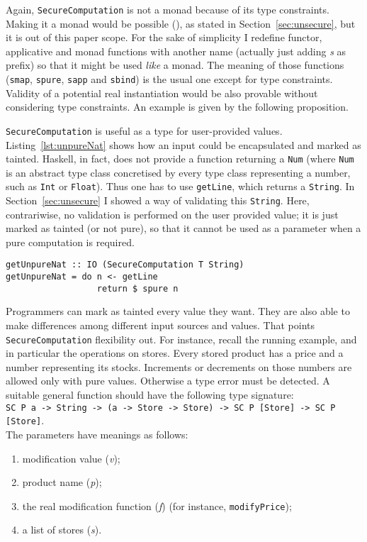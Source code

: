 Again, \texttt{SecureComputation} is not a monad because of its type constraints. Making it a monad would be possible (\cite{Sculthorpe:13:ConstrainedMonad}), as stated in Section~\ref{sec:unsecure}, but it is out of this paper scope. For the sake of simplicity I redefine functor, applicative and monad functions with another name (actually just adding \textit{s} as prefix) so that it might be used \textit{like} a monad. The meaning of those functions (\texttt{smap}, \texttt{spure}, \texttt{sapp} and \texttt{sbind}) is the usual one except for type constraints. Validity of a potential real instantiation would be also provable without considering type constraints. An example is given by the following proposition.

\texttt{SecureComputation} is useful as a type for user-provided values. Listing~\ref{lst:unpureNat} shows how an input could be encapsulated and marked as tainted. Haskell, in fact, does not provide a function returning a \texttt{Num} (where \texttt{Num} is an abstract type class concretised by every type class representing a number, such as \texttt{Int} or \texttt{Float}). Thus one has to use \texttt{getLine}, which returns a \texttt{String}. In Section~\ref{sec:unsecure} I showed a way of validating this \texttt{String}. Here, contrariwise, no validation is performed on the user provided value; it is just marked as tainted (or not pure), so that it cannot be used as a parameter when a pure computation is required.
\begin{lstlisting}[caption={Tainted natural number},label={lst:unpureNat}, breaklines=true]
getUnpureNat :: IO (SecureComputation T String)
getUnpureNat = do n <- getLine
                  return $ spure n
\end{lstlisting}
Programmers can mark as tainted every value they want. They are also able to make differences among different input sources and values. That points \texttt{SecureComputation} flexibility out. For instance, recall the running example, and in particular the operations on stores. Every stored product has a price and a number representing its stocks. Increments or decrements on those numbers are allowed only with pure values. Otherwise a type error must be detected. A suitable general function should have the following type signature:\\
\texttt{SC P a -> String -> (a -> Store -> Store) -> SC P [Store] -> SC P [Store]}. \\
The parameters have meanings as follows:
\begin{enumerate}
	\item modification value (\textit{v});
	\item product name (\textit{p});
	\item the real modification function (\textit{f}) (for instance, \texttt{modifyPrice});
	\item a list of stores (\textit{s}).
\end{enumerate}
